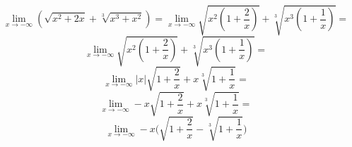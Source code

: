 \documentclass{article}
\begin{document}
\begin{equation*}
    \lim_{x \to - \infty} (\sqrt{x^2 +2x} + \sqrt[3]{x^3 + x^2}) = \lim_{x \to - \infty}   \sqrt{x^2 (1 + \frac{2}{x})} + \sqrt[3]{x^3 (1 + \frac{1}{x})} =
\end{equation*}
\begin{equation*}
    \lim_{x \to - \infty}  \sqrt{x^2 (1 + \frac{2}{x})} + \sqrt[3]{x^3 (1 + \frac{1}{x})} =
\end{equation*}
\begin{equation*}
    \lim_{x \to -\infty} |x| \sqrt{1 + \frac{2}{x}} + x \sqrt[3]{1 + \frac{1}{x}} =
\end{equation*}
\begin{equation*}
    \lim_{x \to -\infty} -x \sqrt{1 + \frac{2}{x}} + x \sqrt[3]{1 + \frac{1}{x}} =
\end{equation*}
\begin{equation*}
    \lim_{x \to -\infty} -x \Big(\sqrt{1 + \frac{2}{x}} - \sqrt[3]{1 + \frac{1}{x}}\Big)
\end{equation*}
\end{document}
